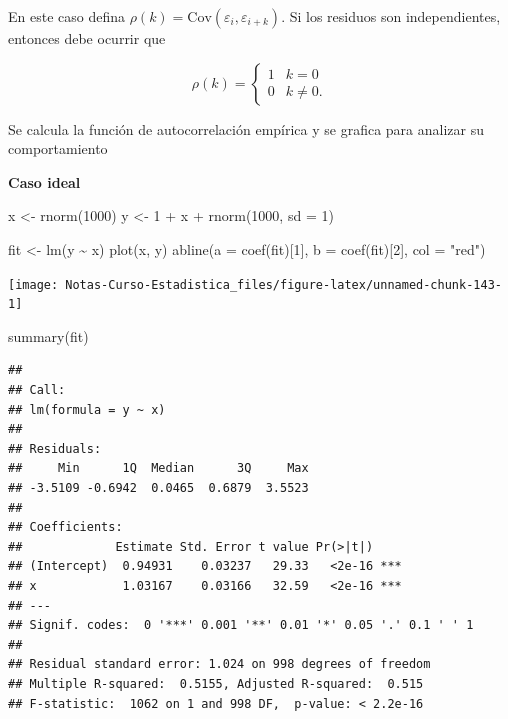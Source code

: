 \documentclass[
  12pt,
]{book}
\newenvironment{Shaded}{\begin{snugshade}}{\end{snugshade}}
\newcommand{\AttributeTok}[1]{\textcolor[rgb]{0.77,0.63,0.00}{#1}}
\newcommand{\DecValTok}[1]{\textcolor[rgb]{0.00,0.00,0.81}{#1}}
\newcommand{\FunctionTok}[1]{\textcolor[rgb]{0.00,0.00,0.00}{#1}}
\newcommand{\NormalTok}[1]{#1}
\newcommand{\OtherTok}[1]{\textcolor[rgb]{0.56,0.35,0.01}{#1}}
\newcommand{\SpecialCharTok}[1]{\textcolor[rgb]{0.00,0.00,0.00}{#1}}
\newcommand{\StringTok}[1]{\textcolor[rgb]{0.31,0.60,0.02}{#1}}
\theoremstyle{definition}
\theoremstyle{definition}
\theoremstyle{definition}
\theoremstyle{definition}
\theoremstyle{remark}
\begin{document}
En este caso defina \(\rho(k) = \text{Cov}(\varepsilon_i,\varepsilon_{i+k} )\). Si los residuos son independientes, entonces debe ocurrir que

\begin{equation*}
\rho(k) = \begin{cases}
1 & k=0\\
0 & k\neq 0.
\end{cases}  
\end{equation*}

Se calcula la función de autocorrelación empírica y se grafica para analizar su comportamiento

\textbf{Caso ideal}

\begin{Shaded}
\begin{Highlighting}[]
\NormalTok{x }\OtherTok{\textless{}{-}} \FunctionTok{rnorm}\NormalTok{(}\DecValTok{1000}\NormalTok{)}
\NormalTok{y }\OtherTok{\textless{}{-}} \DecValTok{1} \SpecialCharTok{+}\NormalTok{ x }\SpecialCharTok{+} \FunctionTok{rnorm}\NormalTok{(}\DecValTok{1000}\NormalTok{, }\AttributeTok{sd =} \DecValTok{1}\NormalTok{)}
\end{Highlighting}
\end{Shaded}

\begin{Shaded}
\begin{Highlighting}[]
\NormalTok{fit }\OtherTok{\textless{}{-}} \FunctionTok{lm}\NormalTok{(y }\SpecialCharTok{\textasciitilde{}}\NormalTok{ x)}
\FunctionTok{plot}\NormalTok{(x, y)}
\FunctionTok{abline}\NormalTok{(}\AttributeTok{a =} \FunctionTok{coef}\NormalTok{(fit)[}\DecValTok{1}\NormalTok{], }\AttributeTok{b =} \FunctionTok{coef}\NormalTok{(fit)[}\DecValTok{2}\NormalTok{], }\AttributeTok{col =} \StringTok{"red"}\NormalTok{)}
\end{Highlighting}
\end{Shaded}

\begin{center}\texttt{[image: Notas-Curso-Estadistica\_files/figure-latex/unnamed-chunk-143-1]} \end{center}

\begin{Shaded}
\begin{Highlighting}[]
\FunctionTok{summary}\NormalTok{(fit)}
\end{Highlighting}
\end{Shaded}

\begin{verbatim}
## 
## Call:
## lm(formula = y ~ x)
## 
## Residuals:
##     Min      1Q  Median      3Q     Max 
## -3.5109 -0.6942  0.0465  0.6879  3.5523 
## 
## Coefficients:
##             Estimate Std. Error t value Pr(>|t|)    
## (Intercept)  0.94931    0.03237   29.33   <2e-16 ***
## x            1.03167    0.03166   32.59   <2e-16 ***
## ---
## Signif. codes:  0 '***' 0.001 '**' 0.01 '*' 0.05 '.' 0.1 ' ' 1
## 
## Residual standard error: 1.024 on 998 degrees of freedom
## Multiple R-squared:  0.5155, Adjusted R-squared:  0.515 
## F-statistic:  1062 on 1 and 998 DF,  p-value: < 2.2e-16
\end{verbatim}
\end{document}
